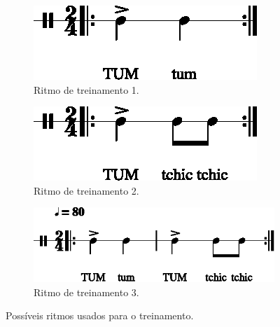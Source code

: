 \begin{figure}[ht]
\centering
\begin{subfigure}{.45\textwidth}
  \centering
  \includegraphics[width=.8\linewidth]{chapters/cap-musicalidade/timing0-1.eps}  
  \caption{Ritmo de treinamento 1.}
  \label{fig:ex:timing:a}
\end{subfigure}
\hfill	
\begin{subfigure}{.45\textwidth}
  \centering
  \includegraphics[width=.8\linewidth]{chapters/cap-musicalidade/timing1-1.eps}  
  \caption{Ritmo de treinamento 2.}
  \label{fig:ex:timing:b}
\end{subfigure}
\hfill
\begin{subfigure}{.65\textwidth}
  \centering
  \includegraphics[width=.8\linewidth]{chapters/cap-musicalidade/timing2-1.eps}  
  \caption{Ritmo de treinamento 3.}
  \label{fig:ex:timing:c}
\end{subfigure}
\caption{Possíveis ritmos usados para o treinamento.}
\label{fig:ex:timing}
\end{figure}

